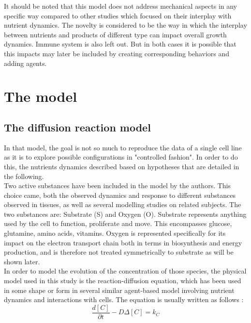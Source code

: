 \documentclass[11pt,a4paper]{article}
\begin{document}
It should be noted that this model does not address mechanical aspects in any specific way compared to other studies which focused on their interplay with nutrient dynamics.\cite{Milotti2010}\cite{Bull2020} The novelty is considered to be the way in which the interplay between nutrients and products of different type can impact overall growth dynamics. Immune system is also left out. But in both cases it is possible that this impacts may later be included by creating corresponding behaviors and adding agents.\\

\newpage
\section{The model}

\subsection{The diffusion reaction model}
In that model, the goal is not so much to reproduce the data of a single cell line as it is to explore possible configurations in "controlled fashion". In order to do this, the nutrients dynamics described based on hypotheses that are detailed in the following.\\

Two active substances have been included in the model by the authors. This choice came, both the observed dynamics and response to different substances observed in tissues, as well as several modelling studies on related subjects.\cite{Bull2020}\cite{Kempf2005}\cite{Mao2018}\cite{Jagiella2016} The two substances are: Substrate (S) and  Oxygen (O). Substrate represents anything used by the cell to function, proliferate and move. This encompasses glucose, glutamine, amino acids, vitamins. Oxygen is represented specifically for its impact on the electron transport chain both in terms in biosynthesis and energy production, and is therefore not treated symmetrically to substrate as will be shown later. \\

In order to model the evolution of the concentration of those species, the physical model used in this study is the reaction-diffusion equation, which has been used in some shape or form in several similar agent-based model involving nutrient dynamics and interactions with cells.\cite{Kempf2005}\cite{Mao2018} \cite{Bull2020} 
\cite{Cleri2019}\cite{Kempf2015}
The equation is usually written as follows : 
\[ \frac{d [C]}{\partial t}  -  D \Delta [C] = k_C  \]
\end{document}
